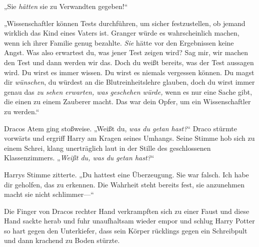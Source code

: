 „Sie \emph{hätten} sie zu Verwandten gegeben!“

„Wissenschaftler können Tests durchführen, um sicher festzustellen, ob jemand wirklich das Kind eines Vaters ist. Granger würde es wahrscheinlich machen, wenn ich ihrer Familie genug bezahlte. \emph{Sie} hätte vor den Ergebnissen keine Angst. Was also erwartest du, was jener Test zeigen wird? Sag mir, wir machen den Test und dann werden wir das. Doch du weißt bereits, was der Test aussagen wird. Du wirst es immer wissen. Du wirst es niemals vergessen können. Du magst dir \emph{wünschen}, du würdest an die Blutreinheitslehre glauben, doch du wirst immer genau das \emph{zu sehen erwarten, was geschehen würde,} wenn es nur eine Sache gibt, die einen zu einem Zauberer macht. Das war dein Opfer, um ein Wissenschaftler zu werden.“

Dracos Atem ging stoßweise. „Weißt du, \emph{was du getan hast?}“ Draco stürmte vorwärts und ergriff Harry am Kragen seines Umhangs. Seine Stimme hob sich zu einem Schrei, klang unerträglich laut in der Stille des geschlossenen Klassenzimmers. „\emph{Weißt du, was du getan hast?}“

Harrys Stimme zitterte. „Du hattest eine Überzeugung. Sie war falsch. Ich habe dir geholfen, das zu erkennen. Die Wahrheit steht bereits fest, sie anzunehmen macht sie nicht schlimmer—“

Die Finger von Dracos rechter Hand verkrampften sich zu einer Faust und diese Hand sackte herab und fuhr unaufhaltsam wieder empor und schlug Harry Potter so hart gegen den Unterkiefer, dass sein Körper rücklings gegen ein Schreibpult und dann krachend zu Boden stürzte.

